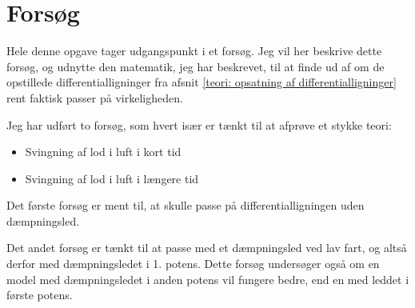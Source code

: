 \chapter{Forsøg}
Hele denne opgave tager udgangspunkt i et forsøg.
Jeg vil her beskrive dette forsøg, og udnytte den matematik, jeg har beskrevet, til at finde ud af om de opstillede differentialligninger fra afsnit \ref{teori: opsatning af differentialligninger} rent faktisk passer på virkeligheden.

Jeg har udført to forsøg, som hvert især er tænkt til at afprøve et stykke teori:
\begin{itemize}
	\item Svingning af lod i luft i kort tid
	\item Svingning af lod i luft i længere tid
\end{itemize}

Det første forsøg er ment til, at skulle passe på differentialligningen uden dæmpningsled.

Det andet forsøg er tænkt til at passe med et dæmpningsled ved lav fart, og altså derfor med dæmpningsledet i 1. potens.
Dette forsøg undersøger også om en model med dæmpningsledet i anden potens vil fungere bedre, end en med leddet i første potens.  
